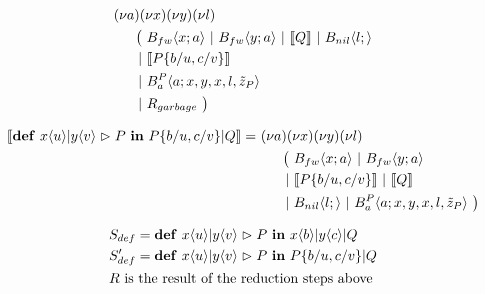 
\begin{align*}
  &\anew{a}{\anew{x}{\anew{y}{\anew{l}{ \\
    &\hspace{0.5cm}
    \begin{aligned}[t]
      \big(\ &\ains{B_{fw}}{x}{a}
      \apar   \ains{B_{fw}}{y}{a}
      \apar   \encMJtoAP{Q}
      \apar   \ains{B_{nil}}{l}{}
      \\
      \apar  &\encMJtoAP{P\substitution{\subst{b}{u},\subst{c}{v}}}
      \\
      \apar  &\ains{B_a^P}{a}{x, y, x, l,\tilde{z}_P}
      \\
      \apar  &R_{garbage}
      \ \big)
    \end{aligned}
  }}}}
\end{align*}


\begin{align*}
  \encMJtoAP{\jdef{\jrct{\jrcv{x}{u} \jpat \jrcv{y}{v}}{P}}{P\substitution{\subst{b}{u},\subst{c}{v}} \jpar Q}}
  =\ &\anew{a}{\anew{x}{\anew{y}{\anew{l}{ \\
      &\hspace{0.5cm}
      \begin{aligned}[t]
        \big(\ &\ains{B_{fw}}{x}{a}
        \apar   \ains{B_{fw}}{y}{a} \\
        \apar  &\encMJtoAP{P\substitution{\subst{b}{u},\subst{c}{v}}} \apar \encMJtoAP{Q} \\
        \apar  &\ains{B_{nil}}{l}{}
        \apar   \ains{B_a^P}{a}{x, y, x, l, \tilde{z}_P}
        \ \big)
      \end{aligned}
    }}}}
\end{align*}



\begin{align*}
  &S_{def}  = \textbf{\textup{def}} \ x\langle u\rangle | y\langle v\rangle \vartriangleright P \ \textbf{\textup{in}} \ x\langle b\rangle | y\langle c\rangle | Q \\
  &S_{def}' = \textbf{\textup{def}} \ x\langle u\rangle | y\langle v\rangle \vartriangleright P \ \textbf{\textup{in}} \ P\{ b / u,c / v \} | Q \\
  &R \text{ is the result of the reduction steps above}
\end{align*}

